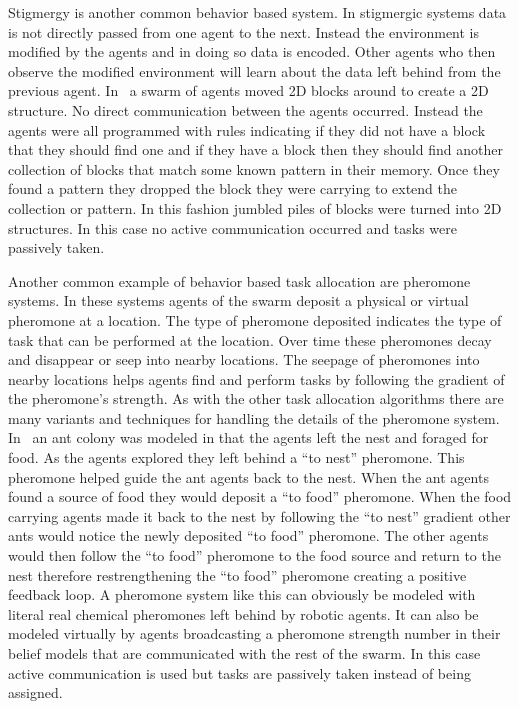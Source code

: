 Stigmergy is another common behavior based system.  In stigmergic systems data is not directly passed from one agent to the next.  Instead the environment is modified by the agents and in doing so data is encoded.  Other agents who then observe the modified environment will learn about the data left behind from the previous agent.  In~\cite{stigmergy_building} a swarm of agents moved 2D blocks around to create a 2D structure.  No direct communication between the agents occurred.  Instead the agents were all programmed with rules indicating if they did not have a block that they should find one and if they have a block then they should find another collection of blocks that match some known pattern in their memory.  Once they found a pattern they dropped the block they were carrying to extend the collection or pattern.  In this fashion jumbled piles of blocks were turned into 2D structures.  In this case no active communication occurred and tasks were passively taken.

Another common example of behavior based task allocation are pheromone systems.  In these systems agents of the swarm deposit a physical or virtual pheromone at a location.  The type of pheromone deposited indicates the type of task that can be performed at the location.  Over time these pheromones decay and disappear or seep into nearby locations.  The seepage of pheromones into nearby locations helps agents find and perform tasks by following the gradient of the pheromone's strength.  As with the other task allocation algorithms there are many variants and techniques for handling the details of the pheromone system.  In~\cite{pheromone} an ant colony was modeled in that the agents left the nest and foraged for food.  As the agents explored they left behind a ``to nest'' pheromone.  This pheromone helped guide the ant agents back to the nest.  When the ant agents found a source of food they would deposit a ``to food'' pheromone.  When the food carrying agents made it back to the nest by following the ``to nest'' gradient other ants would notice the newly deposited ``to food'' pheromone.  The other agents would then follow the ``to food'' pheromone to the food source and return to the nest therefore restrengthening the ``to food'' pheromone creating a positive feedback loop.  A pheromone system like this can obviously be modeled with literal real chemical pheromones left behind by robotic agents.  It can also be modeled virtually by agents broadcasting a pheromone strength number in their belief models that are communicated with the rest of the swarm.  In this case active communication is used but tasks are passively taken instead of being assigned.

